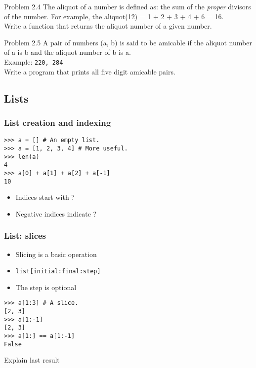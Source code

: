\documentclass[14pt,compress]{beamer}
\newcounter{time}
\newcommand{\inctime}[1]{\addtocounter{time}{#1}{\tiny \thetime\ m}}
\newcommand{\typ}[1]{\texttt{#1}}
\begin{document}
\begin{frame}{Problem 2.4}
  The aliquot of a number is defined as: the sum of the \emph{proper} divisors of the number. For example, the aliquot(12) = 1 + 2 + 3 + 4 + 6 = 16.\\
  Write a function that returns the aliquot number of a given number. 
\end{frame}

\begin{frame}{Problem 2.5}
  A pair of numbers (a, b) is said to be \alert{amicable} if the aliquot number of a is b and the aliquot number of b is a.\\
  Example: \texttt{220, 284}\\
  Write a program that prints all five digit amicable pairs.
  \inctime{30}
\end{frame}


\subsection{Lists}

\begin{frame}[fragile]
  \frametitle{List creation and indexing}
\begin{lstlisting}
>>> a = [] # An empty list.
>>> a = [1, 2, 3, 4] # More useful.
>>> len(a) 
4
>>> a[0] + a[1] + a[2] + a[-1]
10
\end{lstlisting}
  \begin{itemize}
  \item Indices start with ?
  \item Negative indices indicate ?
  \end{itemize}
\end{frame}

\begin{frame}[fragile]
  \frametitle{List: slices}
  \begin{itemize}
  \item Slicing is a basic operation
  \item \typ{list[initial:final:step]}
  \item  The step is optional
  \end{itemize}
\begin{lstlisting}
>>> a[1:3] # A slice.
[2, 3]
>>> a[1:-1]
[2, 3]
>>> a[1:] == a[1:-1]
False  
\end{lstlisting}
Explain last result
\end{frame}
\end{document}
